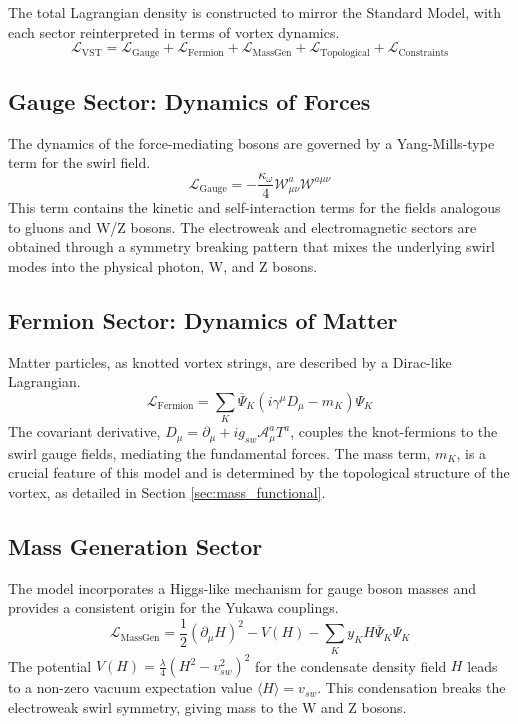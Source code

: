 \documentclass[12pt, a4paper]{article}
\begin{document}
    The total Lagrangian density is constructed to mirror the Standard Model, with each sector reinterpreted in terms of vortex dynamics.
    \begin{equation}
        \mathcal{L}_{\text{VST}} = \mathcal{L}_{\text{Gauge}} + \mathcal{L}_{\text{Fermion}} + \mathcal{L}_{\text{MassGen}} + \mathcal{L}_{\text{Topological}} + \mathcal{L}_{\text{Constraints}}
    \end{equation}

    \subsection{Gauge Sector: Dynamics of Forces}
    The dynamics of the force-mediating bosons are governed by a Yang-Mills-type term for the swirl field.
    \begin{equation}
        \mathcal{L}_{\text{Gauge}} = -\frac{\kappa_\omega}{4} \mathcal{W}_{\mu\nu}^a \mathcal{W}^{a \mu\nu}
    \end{equation}
    This term contains the kinetic and self-interaction terms for the fields analogous to gluons and W/Z bosons. The electroweak and electromagnetic sectors are obtained through a symmetry breaking pattern that mixes the underlying swirl modes into the physical photon, W, and Z bosons.

    \subsection{Fermion Sector: Dynamics of Matter}
    Matter particles, as knotted vortex strings, are described by a Dirac-like Lagrangian.
    \begin{equation}
        \mathcal{L}_{\text{Fermion}} = \sum_K \overline{\Psi}_K (i \gamma^\mu D_\mu - m_K) \Psi_K
    \end{equation}
    The covariant derivative, $D_\mu = \partial_\mu + i g_{sw} \mathcal{A}_\mu^a T^a$, couples the knot-fermions to the swirl gauge fields, mediating the fundamental forces. The mass term, $m_K$, is a crucial feature of this model and is determined by the topological structure of the vortex, as detailed in Section \ref{sec:mass_functional}.

    \subsection{Mass Generation Sector}
    The model incorporates a Higgs-like mechanism for gauge boson masses and provides a consistent origin for the Yukawa couplings.
    \begin{equation}
        \mathcal{L}_{\text{MassGen}} = \frac{1}{2}(\partial_\mu H)^2 - V(H) - \sum_K y_K H \overline{\Psi}_K \Psi_K
    \end{equation}
    The potential $V(H) = \frac{\lambda}{4}(H^2 - v_{sw}^2)^2$ for the condensate density field $H$ leads to a non-zero vacuum expectation value $\langle H \rangle = v_{sw}$. This condensation breaks the electroweak swirl symmetry, giving mass to the W and Z bosons.
\end{document}
